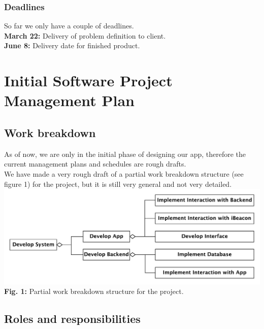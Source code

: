 \documentclass[12pt]{article}
\begin{document}
\subsubsection{Deadlines}
So far we only have a couple of deadlines.\\
\textbf{March 22:} Delivery of problem definition to client.\\
\textbf{June 8:} Delivery date for finished product.\\










\section{Initial Software Project Management Plan}

\subsection{Work breakdown}
As of now, we are only in the initial phase of designing our app, therefore the current management plans and schedules are rough drafts.\\
We have made a very rough draft of a partial work breakdown structure (see figure 1) for the project, but it is still very general and not very detailed.\\

\includegraphics[scale=0.6]{work_breakdown}\\
\textbf{Fig. 1:} Partial work breakdown structure for the project.\\



\subsection{Roles and responsibilities}
\end{document}
